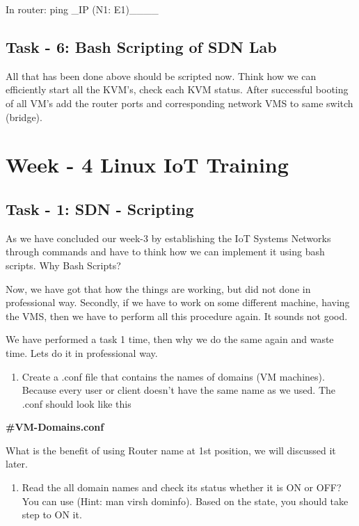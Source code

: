 \documentclass[letterpaper,10pt,english]{sphinxmanual}
\begin{document}
In router: ping \_IP (N1: E1)\_\_\_\_


\section{Task - 6: Bash Scripting of SDN Lab}
\label{week-03:task-6-bash-scripting-of-sdn-lab}
All that has been done above should be scripted now. Think how we can efficiently start all the KVM's, check each KVM status. After successful booting of all VM's add the router ports and corresponding network VMS to same switch (bridge).


\chapter{Week - 4 Linux IoT Training}
\label{week-04:week-4-linux-iot-training}\label{week-04:week-04}\label{week-04::doc}

\section{Task - 1: SDN - Scripting}
\label{week-04:task-1-sdn-scripting}
As we have concluded our week-3 by establishing the IoT Systems Networks through commands and have to think how we can implement it using bash scripts. Why Bash Scripts?

Now, we have got that how the things are working, but did not done in professional way. Secondly, if we have to work on some different machine, having the VMS, then we have to perform all this procedure again. It sounds not good.

We have performed a task 1 time, then why we do the same again and waste time. Lets do it in professional way.
\begin{enumerate}
\item {} 
Create a .conf file that contains the names of domains (VM machines). Because every user or client doesn't have the same name as we used. The .conf should look like this

\end{enumerate}

\textbf{\#VM-Domains.conf}


What is the benefit of using Router name at 1st position, we will discussed it later.
\begin{enumerate}
\item {} 
Read the all domain names and check its status whether it is ON or OFF? You can use (Hint: man virsh dominfo). Based on the state, you should take step to ON it.

\end{enumerate}
\end{document}
